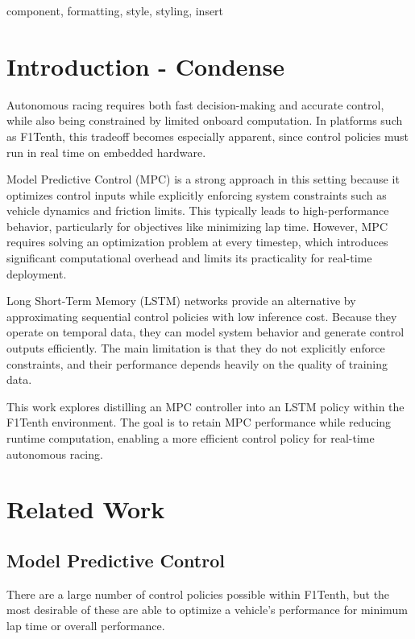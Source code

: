 \documentclass[conference]{IEEEtran}
\begin{document}
\begin{IEEEkeywords}
component, formatting, style, styling, insert
\end{IEEEkeywords}

\section{Introduction - Condense}
Autonomous racing requires both fast decision-making and accurate control, while also being constrained by limited onboard computation. In platforms such as F1Tenth, this tradeoff becomes especially apparent, since control policies must run in real time on embedded hardware.

Model Predictive Control (MPC) is a strong approach in this setting because it optimizes control inputs while explicitly enforcing system constraints such as vehicle dynamics and friction limits. This typically leads to high-performance behavior, particularly for objectives like minimizing lap time. However, MPC requires solving an optimization problem at every timestep, which introduces significant computational overhead and limits its practicality for real-time deployment.

Long Short-Term Memory (LSTM) networks provide an alternative by approximating sequential control policies with low inference cost. Because they operate on temporal data, they can model system behavior and generate control outputs efficiently. The main limitation is that they do not explicitly enforce constraints, and their performance depends heavily on the quality of training data.

This work explores distilling an MPC controller into an LSTM policy within the F1Tenth environment. The goal is to retain MPC performance while reducing runtime computation, enabling a more efficient control policy for real-time autonomous racing.

\section{Related Work}

\subsection{Model Predictive Control}

There are a large number of control policies possible within F1Tenth, but the most desirable of these are able to optimize a vehicle's performance for minimum lap time or overall performance. 
\end{document}
